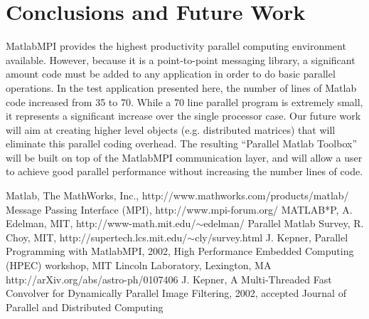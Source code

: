 \documentclass[11pt,twocolumn]{article}
\begin{document}
\section{Conclusions and Future Work}

  MatlabMPI provides the highest productivity parallel computing
environment available.  However, because it is a point-to-point
messaging library, a significant amount code must be added to any
application in order to do basic parallel operations.  In the test
application presented here, the number of lines of Matlab code
increased from 35 to 70.  While a 70 line parallel program is
extremely small, it represents a significant increase over the single
processor case.  Our future work will aim at creating higher level
objects (e.g. distributed matrices) that will eliminate this parallel
coding overhead.  The resulting ``Parallel Matlab Toolbox'' will be
built on top of the MatlabMPI communication layer, and will allow a
user to achieve good parallel performance without increasing the
number lines of code.

\begin{thebibliography}{99}

 Matlab, The MathWorks, Inc.,
    http://www.mathworks.com/products/matlab/
 Message Passing Interface (MPI),
    http://www.mpi-forum.org/
 MATLAB*P, A. Edelman, MIT,
    http://www-math.mit.edu/$\sim$edelman/
 Parallel Matlab Survey, R. Choy, MIT,
    http://supertech.lcs.mit.edu/$\sim$cly/survey.html
 J. Kepner,
   Parallel Programming with MatlabMPI,
   2002, High Performance Embedded Computing (HPEC) workshop,
   MIT Lincoln Laboratory, Lexington, MA
   http://arXiv.org/abs/astro-ph/0107406
 J. Kepner,
   A Multi-Threaded Fast Convolver for Dynamically Parallel Image Filtering,
   2002, accepted Journal of Parallel and Distributed Computing

\end{thebibliography}
\end{document}
